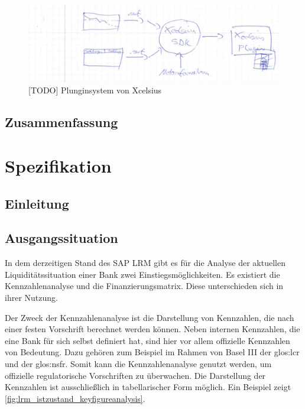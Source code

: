 \begin{onehalfspacing}
\begin{figure}[h]
\centering
\setlength{\unitlength}{1mm}
\includegraphics[width=15cm]{images/Xcelsius_Plugin_Allgemein.jpg}
\caption{[TODO] Plunginsystem von Xcelsius\label{fig:xcelsius_plugin}}
\end{figure}


\section{Zusammenfassung}

\chapter{Spezifikation}
\section{Einleitung}

\section{Ausgangssituation}

In dem derzeitigen Stand des SAP LRM gibt es für die Analyse der aktuellen Liquiditätssituation einer Bank zwei Einstiegsmöglichkeiten. Es existiert die Kennzahlenanalyse und die Finanzierungsmatrix. Diese unterschieden sich in ihrer Nutzung.

Der Zweck der Kennzahlenanalyse ist die Darstellung von Kennzahlen, die nach einer festen Vorschrift berechnet werden können. Neben internen Kennzahlen, die eine Bank für sich selbst definiert hat, sind hier vor allem offizielle Kennzahlen von Bedeutung. Dazu gehören zum Beispiel im Rahmen von Basel III der \gls{glos:lcr} und der \gls{glos:nsfr}. Somit kann die Kennzahlenanalyse genutzt werden, um offizielle regulatorische Vorschriften zu überwachen. Die Darstellung der Kennzahlen ist ausschließlich in tabellarischer Form möglich. Ein Beispiel zeigt \vref{fig:lrm_istzustand_keyfigureanalysis}.


\end{onehalfspacing}
